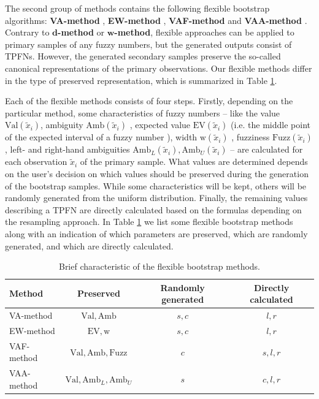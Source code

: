 The second group of methods contains the following flexible bootstrap algorithms: \textbf{VA-method} \citep{grzegorzewski2019,grzegorzewski_amcs2020}, \textbf{EW-method} \citep{grzegorzewski_amcs2020}, \textbf{VAF-method}  \citep{grzegorzewski_ijcis2020} and \textbf{VAA-method} \citep{GrzegorzewskiRom2021}.
Contrary to $\mathbf{d}$\textbf{-method} or $\mathbf{w}$\textbf{-method}, flexible approaches can be applied to primary samples of any fuzzy numbers, but the generated outputs consist of TPFNs. However, the generated secondary samples preserve the so-called canonical representations of the primary observations. Our flexible methods differ in the type of preserved representation, which is summarized in Table \ref{tab101}. 

Each of the flexible methods consists of four steps.
Firstly, depending on the particular method, some characteristics of fuzzy numbers -- like the value $\mathrm{Val}(\tilde{x}_i)$, ambiguity $\mathrm{Amb}(\tilde{x}_i)$ \citep{delgado}, expected value  $\mathrm{EV}(\tilde{x}_i)$ (i.e. the middle point of the expected interval of a fuzzy number \citep{Dubois,Heilpern}), width $\mathrm{w}(\tilde{x}_i)$ \citep{Chanas}, fuzziness $\mathrm{Fuzz} (\tilde{x}_i)$ \citep{delgado}, left- and right-hand ambiguities $\mathrm{Amb}_L (\tilde{x}_i), \mathrm{Amb}_U (\tilde{x}_i)$ -- are calculated for each observation $\tilde{x}_i$ of the primary sample. What values are determined depends on the user's decision on which values should be preserved during the generation of the bootstrap samples. While some characteristics will be kept, others will be randomly generated from the uniform distribution. Finally, the remaining values describing a TPFN are directly calculated based on the formulas depending on the resampling approach. In Table \ref{tab101} we list some flexible bootstrap methods along with an indication of which parameters are preserved, which are randomly generated, and which are directly calculated.

\begin{table}[htbp]
\centering
\begin{tabular}{|l|ccc|}
\hline 
Method & Preserved & Randomly generated & Directly calculated   \\ 
\hline 
VA-method & $\mathrm{Val},\mathrm{Amb}$  & $s,c$ & $l,r$ \\
EW-method & $\mathrm{EV},\mathrm{w}$  & $s,c$ & $l,r$ \\
VAF-method & $\mathrm{Val},\mathrm{Amb},\mathrm{Fuzz}$  & $c$ & $s,l,r$ \\
VAA-method & $\mathrm{Val},\mathrm{Amb}_L,\mathrm{Amb}_U$  & $s$ & $c,l,r$ \\
\hline 
\end{tabular} 
\caption{Brief characteristic of the flexible bootstrap methods.}\label{tab101}
\end{table}


